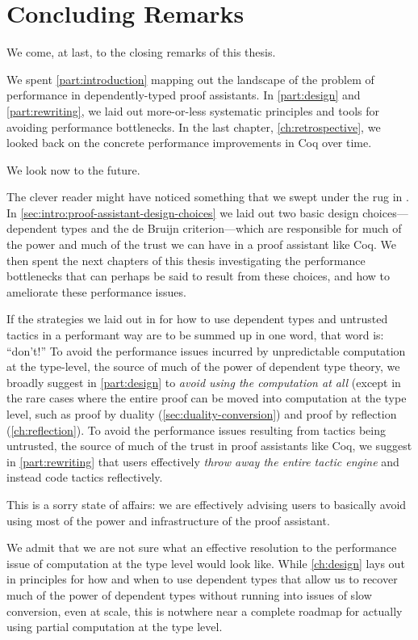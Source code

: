 \chapter{Concluding Remarks}\label{ch:conclusion}
We come, at last, to the closing remarks of this thesis.

We spent \autoref{part:introduction} mapping out the landscape of the problem of performance in dependently-typed proof assistants.
In \autoref{part:design} and \autoref{part:rewriting}, we laid out more-or-less systematic principles and tools for avoiding performance bottlenecks.
In the last chapter, \autoref{ch:retrospective}, we looked back on the concrete performance improvements in Coq over time.

We look now to the future.

The clever reader might have noticed something that we swept under the rug in .
In \autoref{sec:intro:proof-assistant-design-choices} we laid out two basic design choices---dependent types and the de Bruijn criterion---which are responsible for much of the power and much of the trust we can have in a proof assistant like Coq.
We then spent the next chapters of this thesis investigating the performance bottlenecks that can perhaps be said to result from these choices, and how to ameliorate these performance issues.

If the strategies we laid out in  for how to use dependent types and untrusted tactics in a performant way are to be summed up in one word, that word is: ``don't!''
To avoid the performance issues incurred by unpredictable computation at the type-level, the source of much of the power of dependent type theory, we broadly suggest in \autoref{part:design} to \emph{avoid using the computation at all} (except in the rare cases where the entire proof can be moved into computation at the type level, such as proof by duality (\autoref{sec:duality-conversion}) and proof by reflection (\autoref{ch:reflection}).
To avoid the performance issues resulting from tactics being untrusted, the source of much of the trust in proof assistants like Coq, we suggest in \autoref{part:rewriting} that users effectively \emph{throw away the entire tactic engine} and instead code tactics reflectively.

This is a sorry state of affairs:
we are effectively advising users to basically avoid using most of the power and infrastructure of the proof assistant.

We admit that we are not sure what an effective resolution to the performance issue of computation at the type level would look like.
While \autoref{ch:design} lays out in  principles for how and when to use dependent types that allow us to recover much of the power of dependent types without running into issues of slow conversion, even at scale, this is notwhere near a complete roadmap for actually using partial computation at the type level.

